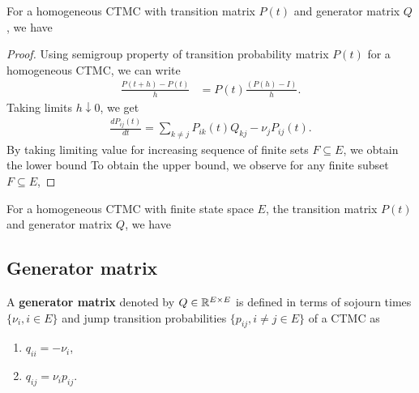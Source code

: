 \documentclass[a4paper,10pt,english]{article}
\begin{document}
\begin{thm} 
For a homogeneous CTMC with transition matrix $P(t)$ and generator matrix $Q$, we have 
\end{thm}
\begin{proof}
Using semigroup property of transition probability matrix $P(t)$ for a homogeneous CTMC,  
we can write
\begin{align*}
\frac{P(t+h) - P(t)}{h} &= P(t)\frac{(P(h) - I)}{h}.
\end{align*}
Taking limits $h \downarrow 0$, we get 
\begin{align*}
\frac{dP_{ij}(t)}{dt} = \sum_{k \neq j}P_{ik}(t)Q_{kj}-\nu_jP_{ij}(t). 
\end{align*}
By taking limiting value for increasing sequence of finite sets $F \subseteq E$, we obtain the lower bound 
To obtain the upper bound, we observe for any finite subset $F \subseteq E$, 
\end{proof}

\begin{cor}
For a homogeneous CTMC with finite state space $E$, the transition matrix $P(t)$ and generator matrix $Q$, we have
\end{cor}
\subsection{Generator matrix}
A \textbf{generator matrix} denoted by $Q \in \mathbb{R}^{E \times E}$ is defined in terms of sojourn times $\{\nu_i, i \in E\}$ and jump transition probabilities $\{p_{ij}, i \neq j \in E\}$ of a CTMC as
\begin{enumerate}[i\_]
\item $q_{ii}= -\nu_i$,
\item $q_{ij}=\nu_i p_{ij}$. 
\end{enumerate}
\end{document}
